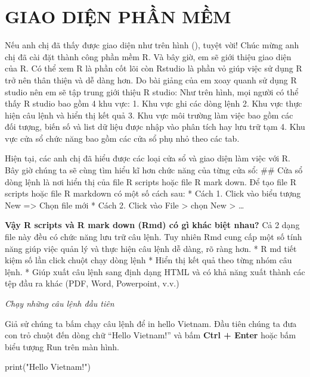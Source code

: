 \documentclass[
]{book}
\newenvironment{Shaded}{\begin{snugshade}}{\end{snugshade}}
\newcommand{\FunctionTok}[1]{\textcolor[rgb]{0.00,0.00,0.00}{#1}}
\newcommand{\NormalTok}[1]{#1}
\newcommand{\StringTok}[1]{\textcolor[rgb]{0.31,0.60,0.02}{#1}}
\theoremstyle{definition}
\theoremstyle{definition}
\theoremstyle{definition}
\theoremstyle{definition}
\theoremstyle{remark}
\begin{document}
\hypertarget{giao-diux1ec7n-phux1ea7n-mux1ec1m}{%
\chapter{GIAO DIỆN PHẦN MỀM}\label{giao-diux1ec7n-phux1ea7n-mux1ec1m}}

Nếu anh chị đã thấy được giao diện như trên hình (), tuyệt vời! Chúc mừng anh chị đã cài đặt thành công phần mềm R. Và bây giờ, em sẽ giới thiệu giao diện của R. Có thể xem R là phần cốt lõi còn Rstudio là phần vỏ giúp việc sử dụng R trở nên thân thiện và dễ dàng hơn. Do bài giảng của em xoay quanh sử dụng R studio nên em sẽ tập trung giới thiệu R studio: Như trên hình, mọi người có thể thấy R studio bao gồm 4 khu vực: 1. Khu vực ghi các dòng lệnh 2. Khu vực thực hiện câu lệnh và hiển thị kết quả 3. Khu vực môi trường làm việc bao gồm các đối tượng, biến số và list dữ liệu được nhập vào phân tích hay lưu trữ tạm 4. Khu vực cửa sổ chức năng bao gồm các cửa sổ phụ nhỏ theo các tab.

Hiện tại, các anh chị đã hiểu được các loại cửa sổ và giao diện làm việc với R. Bây giờ chúng ta sẽ cùng tìm hiểu kĩ hơn chức năng của từng cửa sổ: \#\# Cửa sổ dòng lệnh là nơi hiển thị của file R scripts hoặc file R mark down. Để tạo file R scripts hoặc file R markdown có một số cách sau: * Cách 1. Click vào biểu tượng New =\textgreater{} Chọn file mới * Cách 2. Click vào File \textgreater{} chọn New \textgreater{} \ldots{}

\textbf{Vậy R scripts và R mark down (Rmd) có gì khác biệt nhau?} Cả 2 dạng file này đều có chức năng lưu trữ câu lệnh. Tuy nhiên Rmd cung cấp một số tính năng giúp việc quản lý và thực hiện câu lệnh dễ dàng, rõ ràng hơn. * R md tiết kiệm số lần click chuột chạy dòng lệnh * Hiển thị kết quả theo từng nhóm câu lệnh. * Giúp xuất câu lệnh sang định dạng HTML và có khả năng xuất thành các tệp đầu ra khác (PDF, Word, Powerpoint, v.v.)

\emph{Chạy những câu lệnh đầu tiên}

Giả sử chúng ta bấm chạy câu lệnh để in hello Vietnam. Đầu tiên chúng ta đưa con trỏ chuột đến dòng chữ ``Hello Vietnam!'' và bấm \textbf{Ctrl + Enter} hoặc bấm biểu tượng Run trên màn hình.

\begin{Shaded}
\begin{Highlighting}[]
\FunctionTok{print}\NormalTok{(}\StringTok{"Hello Vietnam!"}\NormalTok{)}
\end{Highlighting}
\end{Shaded}
\end{document}
